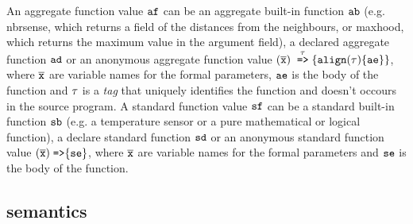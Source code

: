 An aggregate function value $\mathtt{af}$ can be an aggregate built-in function $\mathtt{ab}$ (e.g. nbrsense, which returns a field of the distances from the neighbours, or maxhood, which returns the maximum value in the argument field), a declared aggregate function $\mathtt{ad}$ or an anonymous aggregate function value $ (\overline{\mathtt{x}}) \; \stackrel{\tau}{\mathrm{\texttt{=>}}}{\{\mathtt{align}(\tau)\{\mathtt{ae}\}\}}$, where $\overline{\mathtt{x}}$ are variable names for the formal parameters, $\mathtt{ae}$ is the body of the function and $\tau$ is a \textit{tag} that uniquely identifies the function and doesn't occours in the source program. A standard function value $\mathtt{sf}$ can be a standard built-in function $\mathtt{sb}$ (e.g. a temperature sensor or a pure mathematical or logical function), a declare standard function $\mathtt{sd}$ or an anonymous standard function value $(\overline{\mathtt{x}}) \; \mathrm{ \texttt{=>}\{ } \mathtt{se} \}$, where $\overline{\mathtt{x}}$ are variable names for the formal parameters and $\mathtt{se}$ is the body of the function.

\subsection{\FKotac{} semantics}

